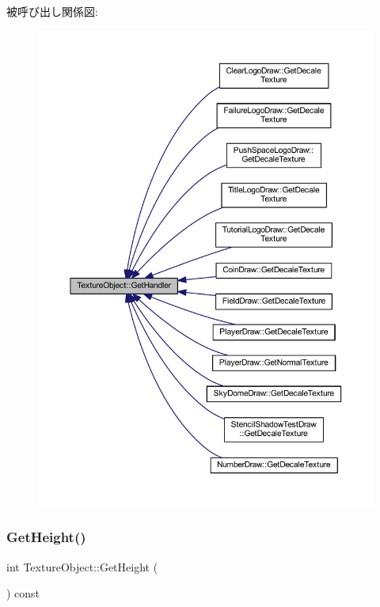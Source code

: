 被呼び出し関係図\+:\nopagebreak
\begin{figure}[H]
\begin{center}
\leavevmode
\includegraphics[width=350pt]{class_texture_object_a1b6c93f36e03686f7198b93355c73c8a_icgraph}
\end{center}
\end{figure}
\mbox{\label{class_texture_object_af312bd8d8cdb31918a00e1fe096c26e0}} 
\subsubsection{\texorpdfstring{Get\+Height()}{GetHeight()}}
{\footnotesize\ttfamily int Texture\+Object\+::\+Get\+Height (\begin{DoxyParamCaption}{ }\end{DoxyParamCaption}) const\hspace{0.3cm}{\ttfamily [inline]}}



